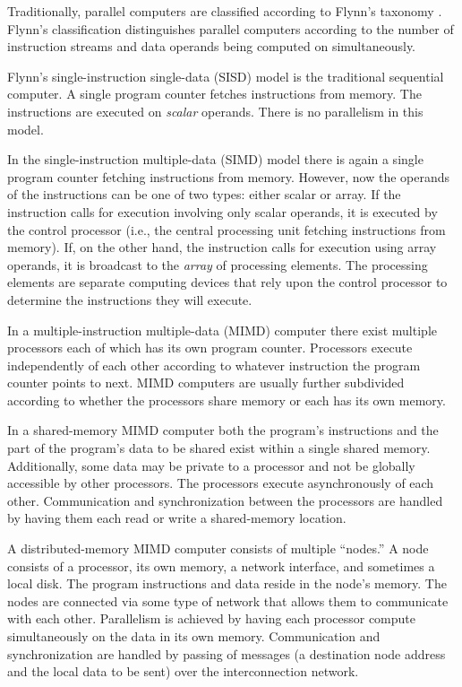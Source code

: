 \documentclass{report}
\begin{document}
Traditionally, parallel computers are classified according to Flynn's
taxonomy \cite{Fl72}.  Flynn's classification distinguishes parallel computers
according to the number of instruction streams and data operands being
computed on simultaneously.  

Flynn's single-instruction single-data (SISD) model is the traditional
sequential computer.  A single program counter fetches instructions from
memory.  The instructions are executed on {\em scalar} operands.  There is no
parallelism in this model.

In the single-instruction multiple-data (SIMD) model there is again a single
program counter fetching instructions from memory.  However, now the operands
of the instructions can be one of two types: either scalar or array.  If the
instruction calls for execution involving only scalar operands, it is executed
by the control processor (i.e., the central processing unit fetching
instructions from memory).  If, on the other hand, the instruction calls for
execution using array operands, it is broadcast to the {\em array} of
processing elements.  The processing elements are separate computing devices
that rely upon the control processor to determine the instructions they will
execute.

In a multiple-instruction multiple-data (MIMD) computer there exist multiple
processors each of which has its own program counter.  Processors execute
independently of each other according to whatever instruction the program
counter points to next.  MIMD computers are usually further subdivided
according to whether the processors share memory or each has its own memory.

In a shared-memory MIMD computer both the program's instructions and the part
of the program's data to be shared exist within a single shared memory.
Additionally, some data may be private to a processor and not be globally
accessible by other processors.  The processors execute asynchronously of each
other.  Communication and synchronization between the processors are handled
by having them each read or write a shared-memory location.

A distributed-memory MIMD computer consists of multiple ``nodes.''  A node
consists of a processor, its own memory, a network interface, and sometimes a
local disk.  The program instructions and data reside in the node's memory.
The nodes are connected via some type of network that allows them to
communicate with each other.  Parallelism is achieved by having each processor
compute simultaneously on the data in its own memory.  Communication and
synchronization are handled by passing of messages (a destination node address
and the local data to be sent) over the interconnection network.
\end{document}
